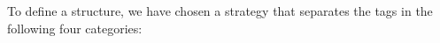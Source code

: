 








To define a structure, we have chosen a strategy that separates the tags in
the following four categories:

